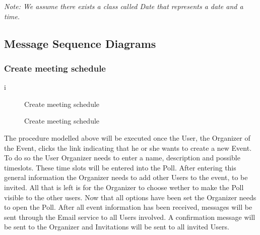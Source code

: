 	\emph{Note: We assume there exists a class called \textnormal{Date} that represents a date and a time.}

\subsection{Message Sequence Diagrams}
	\subsubsection{Create meeting schedule}i
		\begin{figure}[H]
			\centering
			\begin{msc}{Create meeting schedule}

				\nextlevel
				\nextlevel
				\nextlevel

				\nextlevel
				\nextlevel
				\nextlevel
				\nextlevel
				\nextlevel
				\nextlevel
				\nextlevel

				\nextlevel
				\nextlevel
				\nextlevel

				\nextlevel
				\nextlevel
				\nextlevel

				\nextlevel
				\nextlevel
				\nextlevel
				\nextlevel
				\nextlevel
				\nextlevel
				\nextlevel
			\end{msc}
			\caption{Create meeting schedule}
			\label{msc:createmeeting}
		\end{figure}

		The procedure modelled above will be executed once the User, the Organizer of the Event, clicks the link indicating that he or she wants to create a new Event. 
		To do so the User Organizer needs to enter a name, description and possible timeslots. These time slots will be entered into the Poll. After entering this general information the Organizer needs to add other Users to the event, to be invited. All that is left is for the Organizer to choose wether to make the Poll visible to the other users. Now that all options have been set the Organizer needs to open the Poll.
		After all event information has been received, messages will be sent through the Email service to all Users involved. A confirmation message will be sent to the 	Organizer and Invitations will be sent to all invited Users.

